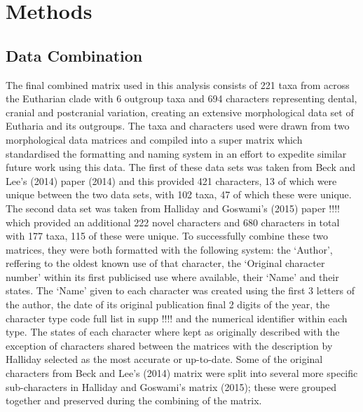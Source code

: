 \documentclass[11pt,letterpaper]{article}
\begin{document}

\newpage

\section{Methods}

\subsection{Data Combination}

The final combined matrix used in this analysis consists of 221 taxa from across the Eutharian clade with 6 outgroup taxa and 694 characters representing dental, cranial and postcranial variation, creating an extensive morphological data set of Eutharia and its outgroups. The taxa and characters used were drawn from two morphological data matrices and compiled into a super matrix which standardised the formatting and naming system in an effort to expedite similar future work using this data. The first of these data sets was taken from Beck and Lee's (2014) paper (2014) and this provided 421 characters, 13 of which were unique between the two data sets, with 102 taxa, 47 of which these were unique. The second data set was taken from Halliday and Goswami's (2015) paper !!!! which provided an additional 222 novel characters and 680 characters in total with 177 taxa, 115 of these were unique. To successfully combine these two matrices, they were both formatted with the following system: the `Author', reffering to the oldest known use of that character, the `Original character number' within its first publicised use where available, their `Name' and their states. The `Name' given to each character was created using the first 3 letters of the author, the date of its original publication final 2 digits of the year, the character type code full list in supp !!!! and the numerical identifier within each type. The states of each character where kept as originally described with the exception of characters shared between the matrices with the description by Halliday selected as the most accurate or up-to-date. Some of the original characters from Beck and Lee's (2014) matrix were split into several more specific sub-characters in Halliday and Goswami's matrix (2015); these were grouped together and preserved during the combining of the matrix.
\end{document}
